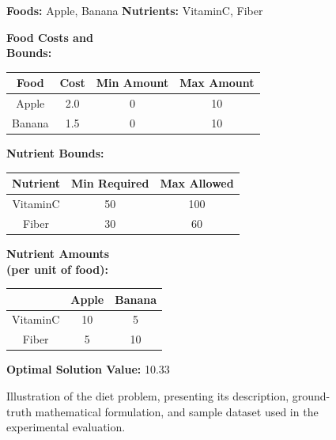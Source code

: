\documentclass[review,12pt]{elsarticle}
\begin{document}
\begin{figure}[htbp]
{{\begin{tcolorbox}
\begin{tcolorbox}[
    width=\linewidth,
    colframe=data, 
    colback=data!10, 
    title={\textbf{Sample Data}}, 
    fonttitle=\bfseries,
    halign title=center,
    boxrule=0.6pt,
    arc=2pt,
    left=1mm, right=1mm, top=0.5mm, bottom=0.5mm,
    before skip=0mm, after skip=0mm
]
\scriptsize
\textbf{Foods:} Apple, Banana \quad \textbf{Nutrients:} VitaminC, Fiber

\textbf{Food Costs and \\ Bounds:}
\vspace{-11mm}
\begin{center}
\begin{tabular}{|c|c|c|c|}
\hline
\textbf{Food} & \textbf{Cost} & \textbf{Min Amount} & \textbf{Max Amount} \\ \hline
Apple  & 2.0 & 0 & 10 \\ \hline
Banana & 1.5 & 0 & 10 \\ \hline
\end{tabular}
\end{center}
\vspace{-3mm}
\textbf{Nutrient Bounds:}
\vspace{-6mm}
\begin{center}
\begin{tabular}{|c|c|c|}
\hline
\textbf{Nutrient} & \textbf{Min Required} & \textbf{Max Allowed} \\ \hline
VitaminC & 50 & 100 \\ \hline
Fiber    & 30 & 60 \\ \hline
\end{tabular}
\end{center}
\vspace{-2.5mm}
\textbf{Nutrient Amounts \\ (per unit of food):}
\vspace{-12mm}
\begin{center}
\begin{tabular}{|c|c|c|}
\hline
 & \textbf{Apple} & \textbf{Banana} \\ \hline
VitaminC & 10 & 5 \\ \hline
Fiber    & 5 & 10 \\ \hline
\end{tabular}
\end{center}
\vspace{-3mm}
\textbf{Optimal Solution Value:} 10.33
\end{tcolorbox}

\end{tcolorbox}
} %
}
\caption{Illustration of the diet problem, presenting its description, ground-truth mathematical formulation, and sample dataset used in the experimental evaluation.}
\label{fig:diet_problem}
\end{figure}
\end{document}
